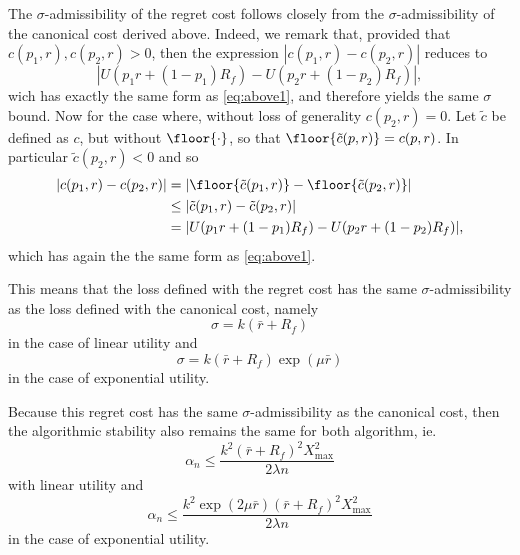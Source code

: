 \begin{rem}
  The $\sigma$-admissibility of the regret cost follows closely from the
  $\sigma$-admissibility of the canonical cost derived above. Indeed, we remark that,
  provided that $c(p_1,r), c(p_2,r) > 0$, then the expression $|c(p_1,r) - c(p_2,r)|$
  reduces to 
  \begin{equation}
    |U(p_1r + (1-p_1)R_f) - U(p_2r + (1-p_2)R_f)|,
  \end{equation}
  wich has exactly the same form as \eqref{eq:above1}, and therefore yields the same
  $\sigma$ bound. Now for the case where, without loss of generality $c(p_2,r) = 0$. Let
  $\tilde c$ be defined as $c$, but without $\floor{\cdot}$, so that
  $\floor{\tilde{c}(p,r)} = c(p,r)$. In particular $\tilde c(p_2,r)<0$ and so
  \begin{align}
    |c(p_1,r) - c(p_2,r)| &= |\floor{\tilde c(p_1,r)} - \floor{\tilde c(p_2,r)}|\\
    &\leq |\tilde c(p_1,r) - \tilde c(p_2,r)|\\
    &= |U(p_1r + (1-p_1)R_f) - U(p_2r + (1-p_2)R_f)|,
  \end{align}
  which has again the the same form as \eqref{eq:above1}.

  This means that the loss defined with the regret cost has the same
  $\sigma$-admissibility as the loss defined with the canonical cost, namely 
  \begin{equation}
    \sigma = k(\bar r + R_f)
  \end{equation}
  in the case of linear utility and 
  \begin{equation}
    \sigma = k(\bar r+R_f) \exp(\mu\bar r)
  \end{equation}
  in the case of exponential utility. 
\end{rem}

\begin{rem}
  Because this regret cost has the same $\sigma$-admissibility as the canonical cost, then
  the algorithmic stability also remains the same for both algorithm, ie.
  \begin{equation}
    \alpha_n \leq \frac{k^2(\bar r+R_f)^2X^2_{\max}}{2\lambda n}
  \end{equation}
  with linear utility and
  \begin{equation}
    \alpha_n \leq \frac{k^2 \exp(2\mu\bar r)(\bar r + R_f)^2 X^2_{\max}}{2\lambda n}
  \end{equation}
  in the case of exponential utility.
\end{rem}

